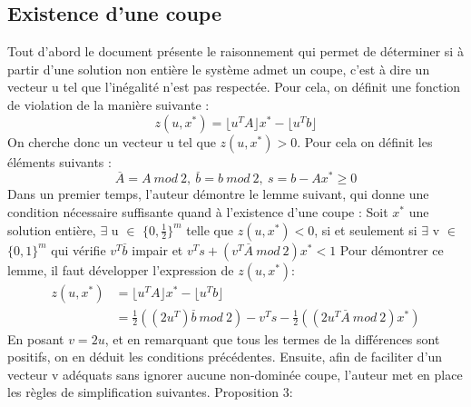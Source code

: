 \documentclass[12pt]{report}
\begin{document}
\subsection{Existence d'une coupe}
Tout d'abord le document présente le raisonnement qui permet de déterminer si à partir d'une solution non entière le système admet un coupe, c'est à dire un vecteur u tel que l'inégalité n'est pas respectée. Pour cela, on définit une fonction de violation de la manière suivante :
$$
z(u,x^\ast)=\lfloor u^TA \rfloor x^\ast-\lfloor u^Tb \rfloor
$$
On cherche donc un vecteur u tel que $z(u,x^\ast)>0$.
Pour cela on définit les éléments suivants :
$$
\overset{\_}{A}=A \ mod \ 2, \ \overset{\_}{b}=b \ mod \ 2,\ s = b-Ax^\ast \ge 0
$$
Dans un premier temps, l'auteur démontre le lemme suivant, qui donne une condition nécessaire suffisante quand à l'existence d'une coupe :
\newline
\newline
Soit $x^\ast$ une solution entière, $\exists$ u $\in$ $\{0,\frac{1}{2}\}^m$ telle que $z(u,x^\ast)<0$, si et seulement si $\exists$ v $\in$ $\{0,1\}^m$ qui vérifie $v^T\overset{\_}{b}$ impair et $v^Ts+(v^T\overset{\_}{A}\ mod\ 2)x^\ast < 1 $
\newline
\newline
Pour démontrer ce lemme, il faut développer l'expression de $z(u,x^\ast)$:
\newline
\begin{equation}
\begin{split}
z(u,x^\ast) & =\lfloor u^TA \rfloor x^\ast-\lfloor u^Tb \rfloor \\
 & = \frac{1}{2}((2u^T)\overset{\_}{b}\ mod\ 2) -v^Ts-\frac{1}{2}((2u^T\overset{\_}{A}\ mod \ 2)x^\ast)
\end{split}
\end{equation}
En posant $v=2u$, et en remarquant que tous les termes de la différences sont positifs, on en déduit les conditions précédentes.
\newline
Ensuite, afin de faciliter d'un vecteur v adéquats sans ignorer aucune non-dominée coupe, l'auteur met en place les règles de simplification suivantes.
\newline
\large{Proposition 3:}
\end{document}
